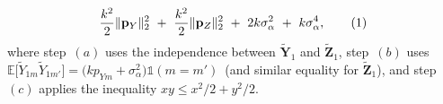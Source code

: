 \documentclass[twoside,11pt]{article}
\newcommand\numberthis{\addtocounter{equation}{1}\tag{\theequation}}
\newcommand{\rvTwo}{Y}
\newcommand{\rvThree}{Z}
\newcommand{\vectorize}[1]{\mathbf{#1}}
\newcommand{\mE}{\mathbb{E}} %
\newcommand{\alphabetSize}{k} %
\newcommand{\vectorIndex}{m}
\newcommand{\probVecElement}[2]{p_{{#1}{#2}}}
\newcommand{\probVec}{\mathbf{p}} %
\newcommand{\privacyParameter}{\alpha} %
\newcommand{\LapUParam}{\sigma_{\privacyParameter}}
\begin{document}
\begin{appendix}
\begin{itemize}
\begin{align*}
		\frac{{\alphabetSize}^2}{2} 
		\|\probVec_\rvTwo\|^2_2
		~+~
		\frac{{\alphabetSize}^2}{2} 
		\|\probVec_\rvThree\|^2_2
		~+~
		2 {\alphabetSize} \LapUParam^2 
		~+~
		\alphabetSize \LapUParam^4, \numberthis \label{eq:MYZTwoThree}	
	\end{align*}
	\noindent
	where step~$(a)$ uses the independence between $\tilde{\vectorize{\rvTwo}}_1$ and $\tilde{\vectorize{\rvThree}}_1$,
	step~$(b)$ uses $
	\mE
	\bigl[
	\tilde{\rvTwo}_{1 \vectorIndex}
	\tilde{\rvTwo}_{1 \vectorIndex'}
	\bigr]
	=
	\bigl(
	\alphabetSize
	\probVecElement{\rvTwo}{\vectorIndex} + \LapUParam^2
	\bigr)
	\mathds{1}(\vectorIndex = \vectorIndex')$~(and similar equality for $\tilde{\vectorize{\rvThree}}_1$), and step~$(c)$ applies the inequality $xy \leq x^2/2 + y^2/2$.
	\\
	

\end{itemize}
\end{appendix}
\end{document}
